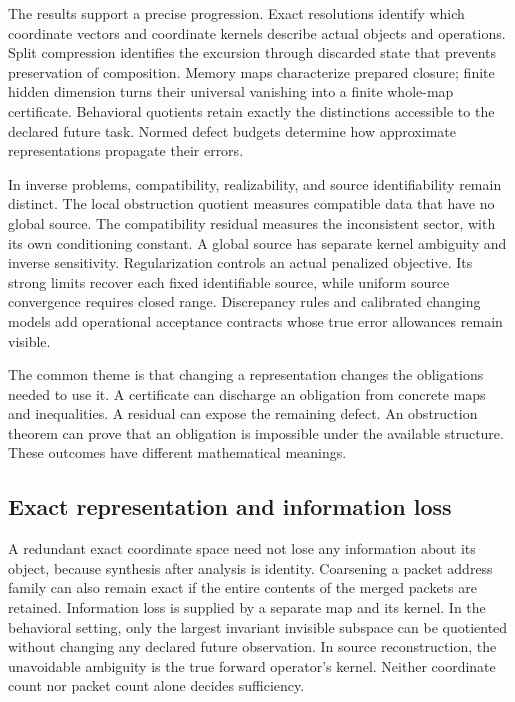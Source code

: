 \documentclass[11pt]{article}
\theoremstyle{definition}\newtheorem{definition}[theorem]{Definition}
\theoremstyle{remark}\newtheorem{remark}[theorem]{Remark}
\begin{document}
The results support a precise progression. Exact resolutions identify which
coordinate vectors and coordinate kernels describe actual objects and
operations. Split compression identifies the excursion through discarded
state that prevents preservation of composition. Memory maps characterize
prepared closure; finite hidden dimension turns their universal vanishing
into a finite whole-map certificate. Behavioral quotients retain exactly
the distinctions accessible to the declared future task. Normed defect
budgets determine how approximate representations propagate their errors.

In inverse problems, compatibility, realizability, and source identifiability
remain distinct. The local obstruction quotient measures compatible data
that have no global source. The compatibility residual measures the
inconsistent sector, with its own conditioning constant. A global source
has separate kernel ambiguity and inverse sensitivity. Regularization
controls an actual penalized objective. Its strong limits recover each
fixed identifiable source, while uniform source convergence requires
closed range. Discrepancy rules and calibrated changing models add
operational acceptance contracts whose true error allowances remain visible.

The common theme is that changing a representation changes the obligations
needed to use it. A certificate can discharge an obligation from concrete
maps and inequalities. A residual can expose the remaining defect.
An obstruction theorem can prove that an obligation is impossible under
the available structure. These outcomes have different mathematical meanings.

\subsection{Exact representation and information loss}
A redundant exact coordinate space need not lose any information about its
object, because synthesis after analysis is identity. Coarsening a packet
address family can also remain exact if the entire contents of the merged
packets are retained. Information loss is supplied by a separate map and
its kernel. In the behavioral setting, only the largest invariant invisible
subspace can be quotiented without changing any declared future observation.
In source reconstruction, the unavoidable ambiguity is the true forward
operator's kernel. Neither coordinate count nor packet count alone decides
sufficiency.
\end{document}
